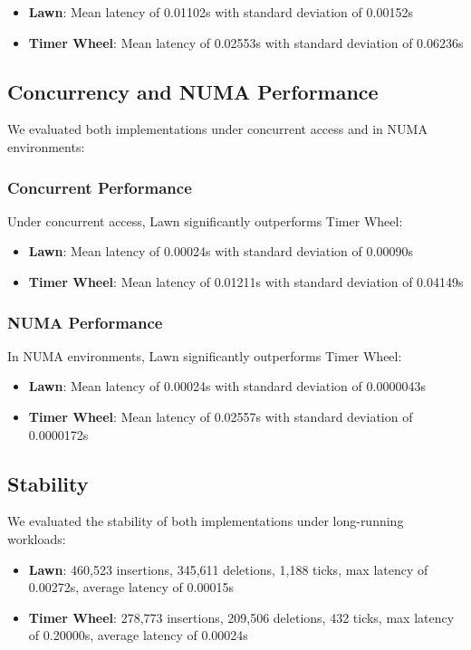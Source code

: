 \documentclass[conference]{IEEEtran}
\begin{document}
\begin{itemize}
    \item \textbf{Lawn}: Mean latency of 0.01102s with standard deviation of 0.00152s
    \item \textbf{Timer Wheel}: Mean latency of 0.02553s with standard deviation of 0.06236s
\end{itemize}

\subsection{Concurrency and NUMA Performance}
We evaluated both implementations under concurrent access and in NUMA environments:

\subsubsection{Concurrent Performance}
Under concurrent access, Lawn significantly outperforms Timer Wheel:

\begin{itemize}
    \item \textbf{Lawn}: Mean latency of 0.00024s with standard deviation of 0.00090s
    \item \textbf{Timer Wheel}: Mean latency of 0.01211s with standard deviation of 0.04149s
\end{itemize}

\subsubsection{NUMA Performance}
In NUMA environments, Lawn significantly outperforms Timer Wheel:

\begin{itemize}
    \item \textbf{Lawn}: Mean latency of 0.00024s with standard deviation of 0.0000043s
    \item \textbf{Timer Wheel}: Mean latency of 0.02557s with standard deviation of 0.0000172s
\end{itemize}

\subsection{Stability}
We evaluated the stability of both implementations under long-running workloads:

\begin{itemize}
    \item \textbf{Lawn}: 460,523 insertions, 345,611 deletions, 1,188 ticks, max latency of 0.00272s, average latency of 0.00015s
    \item \textbf{Timer Wheel}: 278,773 insertions, 209,506 deletions, 432 ticks, max latency of 0.20000s, average latency of 0.00024s
\end{itemize}
\end{document}
